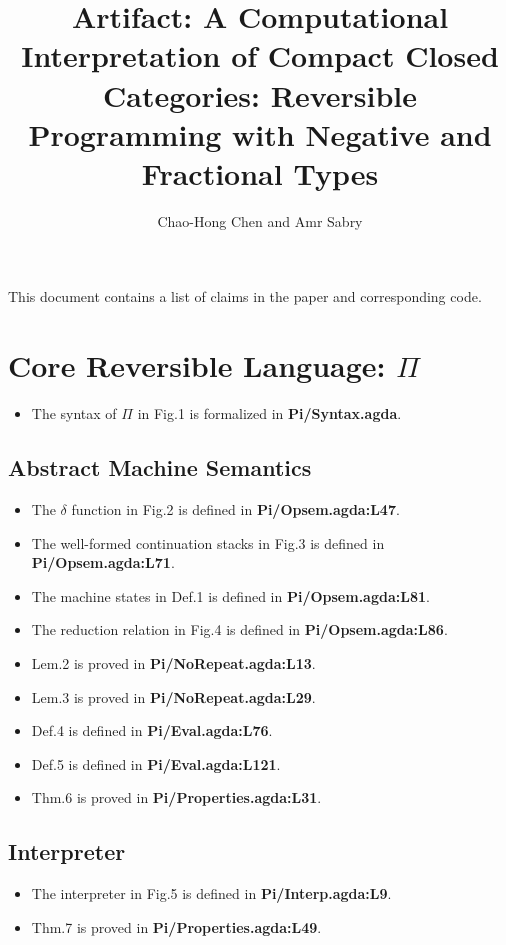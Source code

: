 \documentclass{article}
\begin{document}
\title{Artifact: A Computational Interpretation of Compact Closed Categories: Reversible Programming with Negative and Fractional Types}
\author{Chao-Hong Chen and Amr Sabry}
\maketitle
\noindent
This document contains a list of claims in the paper and corresponding code.

\section{Core Reversible Language: $\Pi$}

\begin{itemize}
\item The syntax of $\Pi$ in Fig.1 is formalized in \textbf{Pi/Syntax.agda}.
\end{itemize}

\subsection{Abstract Machine Semantics}
\begin{itemize}
\item The $\delta$ function in Fig.2 is defined in \textbf{Pi/Opsem.agda:L47}.
\item The well-formed continuation stacks in Fig.3 is defined in \textbf{Pi/Opsem.agda:L71}.
\item The machine states in Def.1 is defined in \textbf{Pi/Opsem.agda:L81}.
\item The reduction relation in Fig.4 is defined in \textbf{Pi/Opsem.agda:L86}.
\item Lem.2 is proved in \textbf{Pi/NoRepeat.agda:L13}.
\item Lem.3 is proved in \textbf{Pi/NoRepeat.agda:L29}.
\item Def.4 is defined in \textbf{Pi/Eval.agda:L76}.
\item Def.5 is defined in \textbf{Pi/Eval.agda:L121}.
\item Thm.6 is proved in \textbf{Pi/Properties.agda:L31}.
\end{itemize}
\subsection{Interpreter}
\begin{itemize}
\item The interpreter in Fig.5 is defined in \textbf{Pi/Interp.agda:L9}.
\item Thm.7 is proved in \textbf{Pi/Properties.agda:L49}.
\end{itemize}
\end{document}
